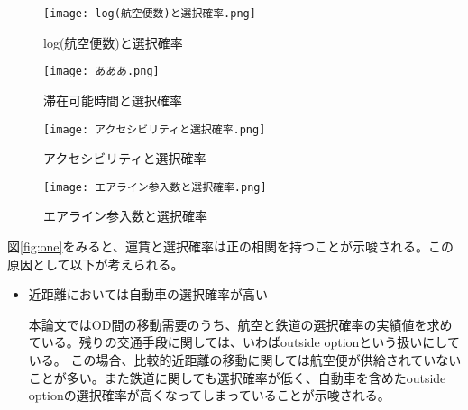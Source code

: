 \documentclass{jsarticle}
\begin{document}
\begin{figure}[htbp]
 \begin{minipage}{0.5\hsize}
  \begin{center}
   \texttt{[image: log(航空便数)と選択確率.png]}
  \end{center}
  \caption{log(航空便数)と選択確率}
  \label{fig:three}
 \end{minipage}
 \begin{minipage}{0.5\hsize}
 \begin{center}
  \texttt{[image: あああ.png]} %
 \end{center}
  \caption{滞在可能時間と選択確率}
  \label{fig:four}
 \end{minipage}
\end{figure}

\begin{figure}[htbp]
 \begin{minipage}{0.5\hsize}
  \begin{center}
   \texttt{[image: アクセシビリティと選択確率.png]}
  \end{center}
  \caption{アクセシビリティと選択確率}
  \label{fig:five}
 \end{minipage}
 \begin{minipage}{0.5\hsize}
 \begin{center}
  \texttt{[image: エアライン参入数と選択確率.png]}
 \end{center}
  \caption{エアライン参入数と選択確率}
  \label{fig:six}
 \end{minipage}
\end{figure}



















図\ref{fig:one}をみると、運賃と選択確率は正の相関を持つことが示唆される。この原因として以下が考えられる。







\begin{itemize} %

\item 近距離においては自動車の選択確率が高い

本論文ではOD間の移動需要のうち、航空と鉄道の選択確率の実績値を求めている。残りの交通手段に関しては、いわばoutside optionという扱いにしている。
この場合、比較的近距離の移動に関しては航空便が供給されていないことが多い。また鉄道に関しても選択確率が低く、自動車を含めたoutside optionの選択確率が高くなってしまっていることが示唆される。



\end{itemize}
\end{document}
